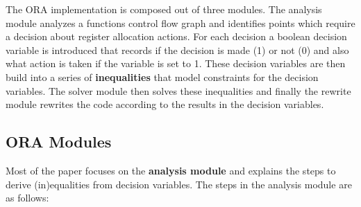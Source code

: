 \documentclass[a4paper,10pt]{article}
\begin{document}
The ORA implementation is composed out of three modules. The analysis module analyzes a functions control flow graph and identifies
points which require a decision about register allocation actions. For each decision a boolean decision variable is introduced that
records if the decision is made (1) or not (0) and also what action is taken if the variable is set to 1. These decision variables are
then build into a series of \textbf{inequalities} that model constraints for the decision variables. The solver module then solves these
inequalities and finally the rewrite module rewrites the code according to the results in the decision variables.

\subsection{ORA Modules}
Most of the paper focuses on the \textbf{analysis module} and explains the steps to derive (in)equalities from decision variables. The
steps in the analysis module are as follows:
\end{document}
